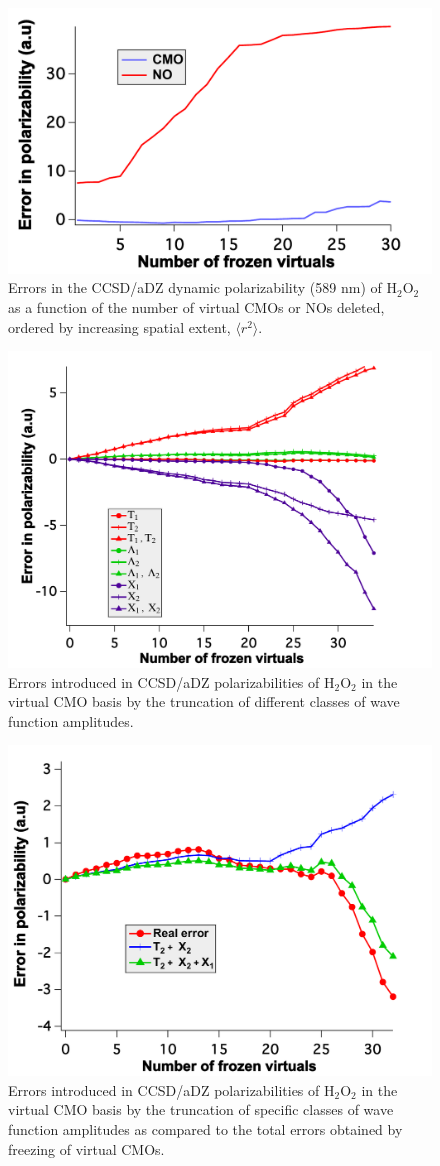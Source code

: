 \begin{figure}
  \centering
  \includegraphics[width=0.6\linewidth]{figures/sort_spatial.pdf}
  \caption{\footnotesize{Errors in the CCSD/aDZ dynamic polarizability (589
nm) of H$_2$O$_2$ as a function of the number of virtual CMOs or NOs deleted,
ordered by increasing spatial extent, $\langle r^2 \rangle$.}}
   \label{fig:sort_spatial}
\end{figure}
\begin{figure}
  \centering
  \includegraphics[width=0.6\linewidth]{figures/amp_trunc_cmo.pdf}
  \caption{\footnotesize{Errors introduced in CCSD/aDZ polarizabilities of
H$_2$O$_2$ in the virtual CMO basis by the truncation of different classes of wave
function amplitudes.}}
   \label{fig:amp_trunc_cmo}
\end{figure}
\begin{figure}
  \centering
  \includegraphics[width=0.6\linewidth]{figures/error_cmpare.pdf}
  \caption{\footnotesize{Errors introduced in CCSD/aDZ polarizabilities of
H$_2$O$_2$ in the virtual CMO basis by the truncation of specific classes of wave
function amplitudes as compared to the total errors obtained by freezing of
virtual CMOs.}}
   \label{fig:error_cmpare}
\end{figure}

